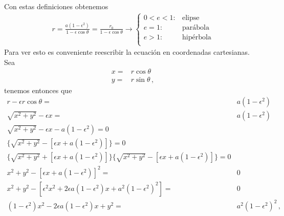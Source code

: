 Con estas definiciones obtenemos
\begin{align}
  \label{eq:conicaspol}
   r=\frac{a(1-\epsilon^2)}{1-\epsilon\cos\theta}
=\frac{r_0}{1-\epsilon\cos\theta}\to
   \begin{cases}
     0<e<1:&\text{elipse}\\
     e=1:& \text{parábola}\\
     e>1:& \text{hipérbola}\\
   \end{cases}
\end{align}
Para ver esto es conveniente reescribir la ecuación en coordenadas cartesianas. Sea
\begin{align*}
  x=&r\cos\theta\\
  y=&r\sin\theta\,,
\end{align*}
tenemos entonces que
\begin{align}
\label{eq:conicacar}
r-\epsilon r\cos\theta=&a(1-\epsilon^2)\nonumber\\
\sqrt{x^2+y^2}-\epsilon x=&a(1-\epsilon^2)\nonumber\\
\sqrt{x^2+y^2}-\epsilon x-a(1-\epsilon^2)=0&\nonumber\\
\{\sqrt{x^2+y^2}-[\epsilon x+a(1-\epsilon^2)]\}=0&\nonumber\\
\{\sqrt{x^2+y^2}+[\epsilon x+a(1-\epsilon^2)]\}\{\sqrt{x^2+y^2}-[\epsilon x+a(1-\epsilon^2)]\}=0&\nonumber\\
x^2+y^2-[\epsilon x+a(1-\epsilon^2)]^2=&0\nonumber\\
x^2+y^2-[\epsilon^2 x^2+2\epsilon a(1-\epsilon^2)x+a^2(1-\epsilon^2)^2]=&0\nonumber\\
(1-\epsilon^2)x^2-2\epsilon a(1-\epsilon^2)x+y^2=&a^2(1-\epsilon^2)^2\,,
\end{align}


